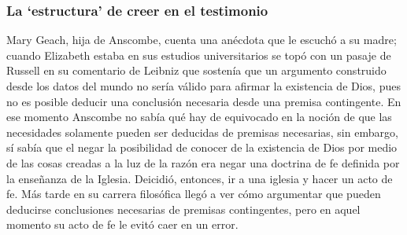 \subsubsection{La `estructura' de creer en el testimonio}

Mary Geach, hija de Anscombe, cuenta una anécdota que le escuchó a su madre; cuando Elizabeth estaba en sus estudios universitarios se topó con un pasaje de Russell en su comentario de Leibniz que sostenía que un argumento construido desde los datos del mundo no sería válido para afirmar la existencia de Dios, pues no es posible deducir una conclusión necesaria desde una premisa contingente. En ese momento Anscombe no sabía qué hay de equivocado en la noción de que las necesidades solamente pueden ser deducidas de premisas necesarias, sin embargo, sí sabía que el negar la posibilidad de conocer de la existencia de Dios por medio de las cosas creadas a la luz de la razón era negar una doctrina de fe definida por la enseñanza de la Iglesia. Deicidió, entonces, ir a una iglesia y hacer un acto de fe. Más tarde en su carrera filosófica llegó a ver cómo argumentar que pueden deducirse conclusiones necesarias de premisas contingentes, pero en aquel momento su acto de fe le evitó caer en un error.

